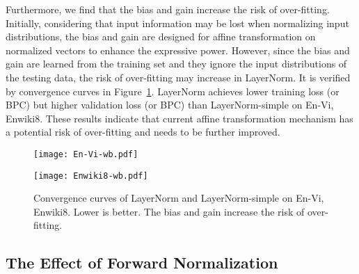 \documentclass{article}
\begin{document}
Furthermore, we find that the bias and gain increase the risk of over-fitting. 
Initially, considering that input information may be lost when normalizing input distributions, the bias and gain are designed for affine transformation on normalized vectors to enhance the expressive power. However, since the bias and gain are learned from the training set and they ignore the input distributions of the testing data, the risk of over-fitting may increase in LayerNorm.
It is verified by convergence curves in Figure~\ref{fig:wb}. 
LayerNorm achieves lower training loss (or BPC) but higher validation loss (or BPC) than LayerNorm-simple on En-Vi, Enwiki8.  These results indicate that current affine transformation mechanism has a potential risk of over-fitting and needs to be further improved. 


  
\begin{figure}[ht]
\centering
\small
\begin{minipage}{.4\textwidth}
  \centering
  \texttt{[image: En-Vi-wb.pdf]}
\end{minipage}\begin{minipage}{.4\textwidth}
  \centering
  \texttt{[image: Enwiki8-wb.pdf]}
\end{minipage}

\caption{Convergence curves of LayerNorm and LayerNorm-simple on En-Vi, Enwiki8. Lower is better. The bias and gain increase the risk of over-fitting. }

 \label{fig:wb}
 \vspace{-0.1in}
\end{figure}





  


\subsection{The Effect of Forward Normalization}
\end{document}
